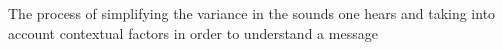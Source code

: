 The process of simplifying the variance in the sounds one hears and taking into account contextual factors in order to understand a message
